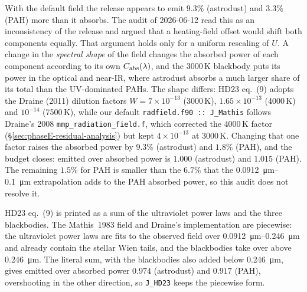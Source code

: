 \documentclass{my_memo}
\newcommand{\Cabs}{\ensuremath{C_{\rm abs}}}
\begin{document}
With the default field the release appears to emit $9.3\%$
(astrodust) and $3.3\%$ (PAH) more than it absorbs. The audit of
2026-06-12 read this as an inconsistency of the release and argued that
a heating-field offset would shift both components equally. That
argument holds only for a uniform rescaling of $U$. A change in the
\emph{spectral shape} of the field changes the absorbed power of each
component according to its own $\Cabs(\lambda)$, and the 3000\,K
blackbody puts its power in the optical and near-IR, where astrodust
absorbs a much larger share of its total than the UV-dominated PAHs. The
shape differs: HD23 eq.~(9) adopts the Draine (2011) dilution factors
$W = 7\times10^{-13}$ (3000\,K), $1.65\times10^{-13}$ (4000\,K) and
$10^{-14}$ (7500\,K), while our default \texttt{radfield.f90 ::
J\_Mathis} follows Draine's 2008 \texttt{mmp\_radiation\_field.f},
which corrected the 4000\,K factor (\S\ref{sec:phaseE-residual-analysis})
but kept $4\times10^{-13}$ at 3000\,K. Changing that one factor raises
the absorbed power by $9.3\%$ (astrodust) and $1.8\%$ (PAH), and the
budget closes: emitted over absorbed power is $1.000$ (astrodust) and
$1.015$ (PAH). The remaining $1.5\%$ for PAH is smaller than the
$6.7\%$ that the \SIrange{0.0912}{0.1}{\micro\meter} extrapolation adds
to the PAH absorbed power, so this audit does not resolve it.

HD23 eq.~(9) is printed as a sum of the ultraviolet power laws and the
three blackbodies. The Mathis~1983 field and Draine's implementation
are piecewise: the ultraviolet power laws are fits to the observed
field over \SIrange{0.0912}{0.246}{\micro\meter} and already contain the
stellar Wien tails, and the blackbodies take over above
\SI{0.246}{\micro\meter}. The literal sum, with the blackbodies also
added below \SI{0.246}{\micro\meter}, gives emitted over absorbed power
$0.974$ (astrodust) and $0.917$ (PAH), overshooting in the other
direction, so \texttt{J\_HD23} keeps the piecewise form.
\end{document}
